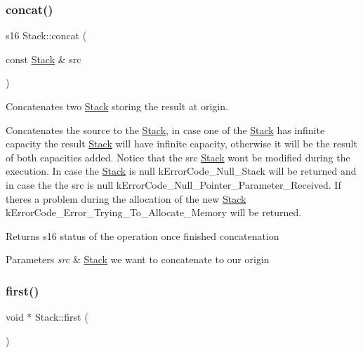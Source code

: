 \subsubsection{\texorpdfstring{concat()}{concat()}}
{\footnotesize\ttfamily s16 Stack\+::concat (\begin{DoxyParamCaption}\item[{const \hyperlink{class_stack}{Stack} \&}]{src }\end{DoxyParamCaption})}



Concatenates two \hyperlink{class_stack}{Stack} storing the result at origin. 

Concatenates the source to the \hyperlink{class_stack}{Stack}, in case one of the \hyperlink{class_stack}{Stack} has infinite capacity the result \hyperlink{class_stack}{Stack} will have infinite capacity, otherwise it will be the result of both capacities added. Notice that the src \hyperlink{class_stack}{Stack} won\textquotesingle{}t be modified during the execution. In case the \hyperlink{class_stack}{Stack} is null k\+Error\+Code\+\_\+\+Null\+\_\+\+Stack will be returned and in case the the src is null k\+Error\+Code\+\_\+\+Null\+\_\+\+Pointer\+\_\+\+Parameter\+\_\+\+Received. If there\textquotesingle{}s a problem during the allocation of the new \hyperlink{class_stack}{Stack} k\+Error\+Code\+\_\+\+Error\+\_\+\+Trying\+\_\+\+To\+\_\+\+Allocate\+\_\+\+Memory will be returned.

\begin{DoxyReturn}{Returns}
s16 status of the operation once finished concatenation 
\end{DoxyReturn}

\begin{DoxyParams}{Parameters}
{\em src} & \hyperlink{class_stack}{Stack} we want to concatenate to our origin \\
\hline
\end{DoxyParams}
\mbox{\label{class_stack_a32a58607561bad2f48e3af293027412c}} 
\subsubsection{\texorpdfstring{first()}{first()}}
{\footnotesize\ttfamily void $\ast$ Stack\+::first (\begin{DoxyParamCaption}{ }\end{DoxyParamCaption})}



